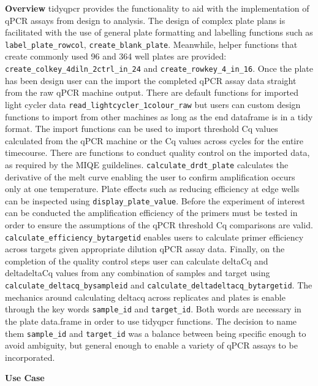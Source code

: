 \documentclass{SBCbookchapter}
\begin{document}
\textbf{Overview}
tidyqpcr provides the functionality to aid with the implementation of qPCR assays from design to analysis. The design of complex plate plans is facilitated with the use of general plate formatting and labelling functions such as \lstinline{label_plate_rowcol}, \lstinline{create_blank_plate}. Meanwhile, helper functions that create commonly used 96 and 364 well plates are provided: \lstinline{create_colkey_4diln_2ctrl_in_24} and \lstinline{create_rowkey_4_in_16}. Once the plate has been design user can the import the completed qPCR assay data straight from the raw qPCR machine output. There are default functions for imported light cycler data \lstinline{read_lightcycler_1colour_raw} but users can custom design functions to import from other machines as long as the end dataframe is in a tidy format. The import functions can be used to import threshold Cq values calculated from the qPCR  machine or the Cq values across cycles for the entire timecourse.  There are functions to conduct quality control on the imported data, as required by the MIQE guildelines. \lstinline{calculate_drdt_plate} calculates the derivative of the melt curve enabling the user to confirm amplification occurs only at one temperature. Plate effects such as reducing efficiency at edge wells can be inspected using \lstinline{display_plate_value}. Before the experiment of interest can be conducted the amplification efficiency of the primers must be tested in order to ensure the assumptions of the qPCR threshold Cq comparisons are valid. \lstinline{calculate_efficiency_bytargetid} enables users to calculate primer efficiency across targets given appropriate dilution qPCR assay data. Finally, on the completion of the quality control steps user can calculate deltaCq and deltadeltaCq values from any combination of samples and target using \lstinline{calculate_deltacq_bysampleid} and \lstinline{calculate_deltadeltacq_bytargetid}. The mechanics around calculating deltacq across replicates and plates is enable through the key words \lstinline{sample_id} and \lstinline{target_id}. Both words are necessary in the plate data.frame in order to use tidyqpcr functions. The decision to name them \lstinline{sample_id} and \lstinline{target_id} was a balance between being specific enough to avoid ambiguity, but general enough to enable a variety of qPCR assays to be incorporated.  

\textbf{Use Case}
\end{document}
